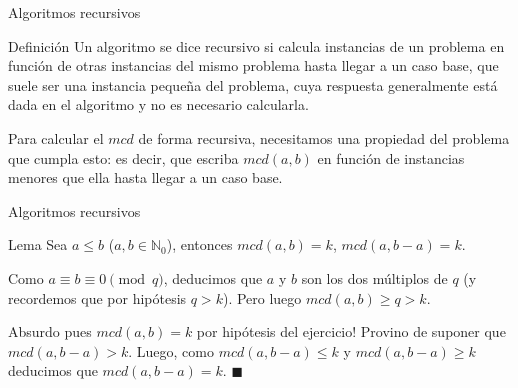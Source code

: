 \documentclass[compress]{beamer}
\begin{document}
\begin{frame}{Algoritmos recursivos}
	\begin{block}{Definici\'on}
	Un algoritmo se dice recursivo si calcula instancias de un problema en funci\'on de otras instancias del mismo problema hasta llegar a un caso base, que suele ser una instancia pequeña del problema, cuya respuesta generalmente est\'a dada en el algoritmo y no es necesario calcularla.
	\end{block}
\bigskip
  Para calcular el $mcd$ de forma recursiva, necesitamos una propiedad del problema que cumpla esto: es decir, que escriba $mcd(a,b)$ en funci\'on de instancias menores que ella hasta llegar a un caso base.
\end{frame}

\begin{frame}{Algoritmos recursivos}
	\begin{block}{Lema}
	Sea $a \leq b$ ($a, b \in \mathbb{N}_0$), entonces $mcd(a, b) = k$, $mcd(a, b-a) = k$.
	\end{block}
\bigskip

\pause
{}
\end{frame}

\begin{frame}
Como $a \equiv b \equiv 0 \pmod{q}$, deducimos que $a$ y $b$ son los dos m\'ultiplos de $q$ (y recordemos que por hip\'otesis $q > k$). 
Pero luego $mcd(a,b) \geq q > k$. \\ \bigskip

\textexclamdown Absurdo pues $mcd(a,b) = k$ por hip\'otesis del ejercicio! Provino de suponer que $mcd(a, b-a) > k$. Luego, 
como $mcd(a, b-a) \leq k$ y $mcd(a, b-a) \geq k$ deducimos que $mcd(a, b-a) = k$. $\blacksquare$

\end{frame}
\end{document}
